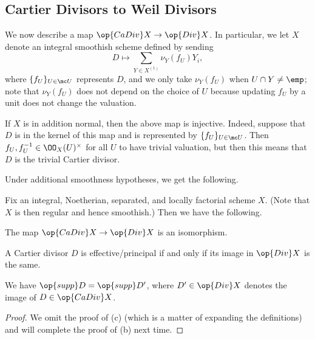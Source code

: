 \documentclass[../notes.tex]{subfiles}
\begin{document}
\subsection{Cartier Divisors to Weil Divisors}
We now describe a map $\op{CaDiv}X\to\op{Div}X$. In particular, we let $X$ denote an integral smoothish scheme defined by sending
\[D\mapsto\sum_{Y\in X^{(1)}}\nu_Y(f_U)Y_i,\]
where $\{f_U\}_{U\in\mc U}$ represents $D$, and we only take $\nu_Y(f_U)$ when $U\cap Y\ne\emp$; note that $\nu_Y(f_U)$ does not depend on the choice of $U$ because updating $f_U$ by a unit does not change the valuation.
\begin{remark}
	If $X$ is in addition normal, then the above map is injective. Indeed, suppose that $D$ is in the kernel of this map and is represented by $\{f_U\}_{U\in\mc U}$. Then $f_U,f_U^{-1}\in\OO_X(U)^\times$ for all $U$ to have trivial valuation, but then this means that $D$ is the trivial Cartier divisor.
\end{remark}
Under additional smoothness hypotheses, we get the following.
\begin{proposition}
	Fix an integral, Noetherian, separated, and locally factorial scheme $X$. (Note that $X$ is then regular and hence smoothish.) Then we have the following.
	\begin{listalph}
		\item The map $\op{CaDiv}X\to\op{Div}X$ is an isomorphism.
		\item A Cartier divisor $D$ is effective/principal if and only if its image in $\op{Div}X$ is the same.
		\item We have $\op{supp}D=\op{supp}D'$, where $D'\in\op{Div}X$ denotes the image of $D\in\op{CaDiv}X$.
	\end{listalph}
\end{proposition}
\begin{proof}
	We omit the proof of (c) (which is a matter of expanding the definitions) and will complete the proof of (b) next time.
\end{proof}
\end{document}
